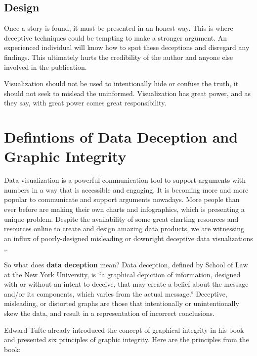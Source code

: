\documentclass[]{book}
\theoremstyle{definition}
\theoremstyle{definition}
\theoremstyle{definition}
\theoremstyle{remark}
\begin{document}
\subsection{Design}\label{design}

Once a story is found, it must be presented in an honest way. This is
where deceptive techniques could be tempting to make a stronger
argument. An experienced individual will know how to spot these
deceptions and disregard any findings. This ultimately hurts the
credibility of the author and anyone else involved in the publication.

Visualization should not be used to intentionally hide or confuse the
truth, it should not seek to mislead the uninformed. Visualization has
great power, and as they say, with great power comes great
responsibility.

\section{Defintions of Data Deception and Graphic
Integrity}\label{defintions-of-data-deception-and-graphic-integrity}

Data visualization is a powerful communication tool to support arguments
with numbers in a way that is accessible and engaging. It is becoming
more and more popular to communicate and support arguments nowadays.
More people than ever before are making their own charts and
infographics, which is presenting a unique problem. Despite the
availability of some great charting resources and resources online to
create and design amazing data products, we are witnessing an influx of
poorly-designed misleading or downright deceptive data visualizations
\citep{decept_study},\citep{rose_tint}.

So what does \textbf{data deception} mean? Data deception, defined by
School of Law at the New York University, is ``a graphical depiction of
information, designed with or without an intent to deceive, that may
create a belief about the message and/or its components, which varies
from the actual message.'' Deceptive, misleading, or distorted graphs
are those that intentionally or unintentionally skew the data, and
result in a representation of incorrect conclusions.

Edward Tufte already introduced the concept of graphical integrity in
his book and presented six principles of graphic integrity. Here are the
principles from the book:
\end{document}
